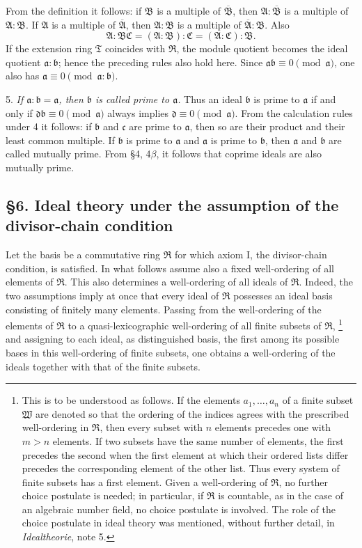 \documentclass[11pt]{article}
\providecommand{\mR}{\mathfrak{R}}
\providecommand{\mT}{\mathfrak{T}}
\providecommand{\mA}{\mathfrak{A}}
\providecommand{\mB}{\mathfrak{B}}
\providecommand{\mC}{\mathfrak{C}}
\providecommand{\ma}{\mathfrak{a}}
\providecommand{\mb}{\mathfrak{b}}
\providecommand{\mc}{\mathfrak{c}}
\providecommand{\md}{\mathfrak{d}}
\begin{document}
From the definition it follows: if $\mB$ is a multiple of $\overline{\mB}$, then $\mA:\overline{\mB}$ is a multiple of $\mA:\mB$. If $\mA$ is a multiple of $\overline{\mA}$, then $\mA:\mB$ is a multiple of $\overline{\mA}:\mB$. Also
\[
        \mA:\mB\mC=(\mA:\mB):\mC=(\mA:\mC):\mB .
\]
If the extension ring $\mT$ coincides with $\mR$, the module quotient becomes the ideal quotient $\ma:\mb$; hence the preceding rules also hold here. Since $\ma\mb\equiv0\pmod{\ma}$, one also has $\ma\equiv0\pmod{\ma:\mb}$.

5. \emph{If $\ma:\mb=\ma$, then $\mb$ is called prime to $\ma$.} Thus an ideal $\mb$ is prime to $\ma$ if and only if $\md\mb\equiv0\pmod{\ma}$ always implies $\md\equiv0\pmod{\ma}$. From the calculation rules under 4 it follows: if $\mb$ and $\mc$ are prime to $\ma$, then so are their product and their least common multiple. If $\mb$ is prime to $\ma$ and $\ma$ is prime to $\mb$, then $\ma$ and $\mb$ are called mutually prime. From §4, 4$\beta$, it follows that coprime ideals are also mutually prime.

\setcounter{footnote}{25}

\subsection*{§6. Ideal theory under the assumption of the divisor-chain condition}

Let the basis be a commutative ring $\mR$ for which axiom I, the divisor-chain condition, is satisfied. In what follows assume also a fixed well-ordering of all elements of $\mR$. This also determines a well-ordering of all ideals of $\mR$. Indeed, the two assumptions imply at once that every ideal of $\mR$ possesses an ideal basis consisting of finitely many elements. Passing from the well-ordering of the elements of $\mR$ to a quasi-lexicographic well-ordering of all finite subsets of $\mR$,
\footnote{This is to be understood as follows. If the elements $a_1,\ldots,a_n$ of a finite subset $\mathfrak W$ are denoted so that the ordering of the indices agrees with the prescribed well-ordering in $\mR$, then every subset with $n$ elements precedes one with $m>n$ elements. If two subsets have the same number of elements, the first precedes the second when the first element at which their ordered lists differ precedes the corresponding element of the other list. Thus every system of finite subsets has a first element. Given a well-ordering of $\mR$, no further choice postulate is needed; in particular, if $\mR$ is countable, as in the case of an algebraic number field, no choice postulate is involved. The role of the choice postulate in ideal theory was mentioned, without further detail, in \emph{Idealtheorie}, note 5.}
and assigning to each ideal, as distinguished basis, the first among its possible bases in this well-ordering of finite subsets, one obtains a well-ordering of the ideals together with that of the finite subsets.
\end{document}
